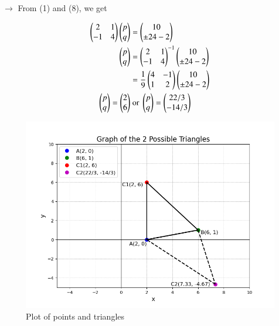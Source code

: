 \documentclass[journal]{IEEEtran}
\begin{document}
$\rightarrow$ From (1) and (8), we get

\begin{align}
    \begin{pmatrix}2 & 1\\-1 & 4\end{pmatrix} \begin{pmatrix}p\\q\end{pmatrix} &= \begin{pmatrix}10\\\pm 24 - 2\end{pmatrix} \\
    \begin{pmatrix}p\\q\end{pmatrix} &= \begin{pmatrix}2 & 1\\-1 & 4\end{pmatrix}^{-1} \begin{pmatrix}10\\ \pm 24 - 2\end{pmatrix} \\
    &= \frac{1}{9} \begin{pmatrix}4 & -1\\1 & 2\end{pmatrix} \begin{pmatrix}10\\ \pm 24 - 2\end{pmatrix} \\
    \begin{pmatrix}p\\q\end{pmatrix} = \begin{pmatrix}2\\6\end{pmatrix} &\text{ or } \begin{pmatrix}p\\q\end{pmatrix} = \begin{pmatrix}22/3\\ -14/3\end{pmatrix}
\end{align}

\begin{figure}[h!]
   \centering
   \includegraphics[width=\linewidth]{figs/01.png}
   \caption{Plot of points and triangles}
   \label{Plot_1}
\end{figure}
\end{document}

